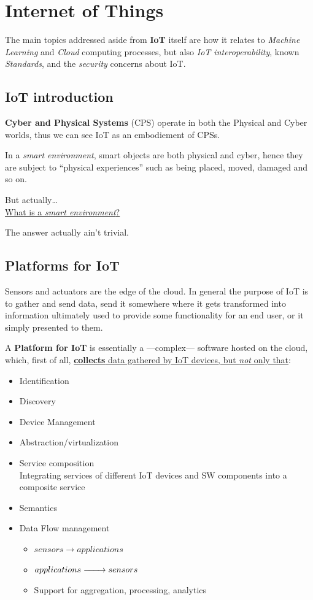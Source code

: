\chapter{Internet of Things}

The main topics addressed aside from \textbf{IoT} itself are how it relates to \textit{Machine Learning} and \textit{Cloud} computing processes, but also \textit{IoT interoperability}, known \textit{Standards}, and the \textit{security} concerns about IoT.

\section{IoT introduction}
\textbf{Cyber and Physical Systems} (CPS) operate in both the Physical and Cyber worlds, thus we can see IoT as an embodiement of CPSs.

In a \textit{smart environment}, smart objects are both physical and cyber, hence they are subject to ``physical experiences'' such as being placed, moved, damaged and so on.
\begin{center}
   But actually\dots\\
   \ul{What is a \textit{smart environment}?}
\end{center}

The answer actually ain't trivial.

\section{Platforms for IoT}
Sensors and actuators are the edge of the cloud.
In general the purpose of IoT is to gather and send data, send it somewhere where it gets transformed into information ultimately used to provide some functionality for an end user, or it simply presented to them.

A \textbf{Platform for IoT} is essentially a ---complex--- software hosted on the cloud, which, first of all, \ul{\textbf{collects} data gathered by IoT devices, but \textit{not} only that}:
\begin{itemize}
   \item Identification
   \item Discovery
   \item Device Management
   \item Abstraction/virtualization
   \item Service composition\\
   Integrating services of different IoT devices and SW components into a composite service
   \item Semantics
   \item Data Flow management
   \begin{itemize}
      \item $sensors \longrightarrow applications$
      \item $applications \xrightarrow{\hspace*{2em}} sensors$
      \item Support for aggregation, processing, analytics
   \end{itemize}
\end{itemize}

